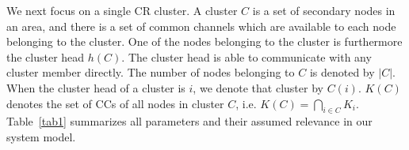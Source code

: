 \documentclass[times]{ettauth}
\theoremstyle{mytheoremstyle}
\theoremstyle{mytheoremstyle}
\theoremstyle{mytheoremstyle}
\begin{document}
We next focus on a single CR cluster. 
A cluster $C$ is a set of secondary nodes in an area, and there is a set of common channels which are available to each node belonging to the cluster.
One of the nodes belonging to the cluster is furthermore the cluster head $h(C)$.
The cluster head is able to communicate with any cluster member directly.
The number of nodes belonging to $C$ is denoted by $|C|$.
When the cluster head of a cluster is $i$, we denote that cluster by $C(i)$.
$K(C)$ denotes the set of CCs of all nodes in cluster $C$, i.e. $ K(C) = \bigcap_{i\in C} K_i$.
Table~\ref{tab1} summarizes all parameters and their assumed relevance in our system model.
\end{document}
